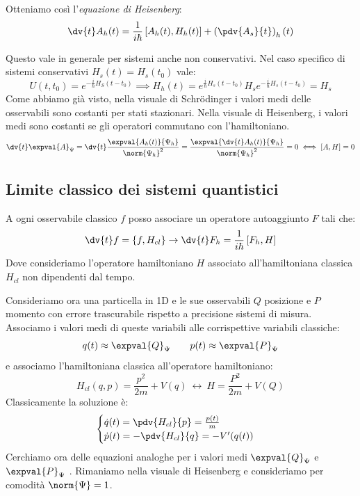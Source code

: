 Otteniamo così l'\textit{equazione di Heisenberg}:
\begin{equation}
    \dv{t} A_h(t) = \frac{1}{i\hbar}\left[ A_h(t), H_h(t) \right]   + \left( \pdv{A_s}{t} \right)_h (t)
\end{equation}

Questo vale in generale per sistemi anche non conservativi. Nel caso specifico di sistemi conservativi \(H_s(t)= H_s(t_0)\) vale:
\begin{equation}
    U(t,t_0)= e^{-\frac{i}{\hbar } H_S (t-t_0)} \implies H_h(t)= e^{\frac{i}{\hbar }H_s(t-t_0)}H_s e^{-\frac{i}{\hbar} H_s(t-t_0)} = H_s
\end{equation}
Come abbiamo già visto, nella visuale di Schrödinger i valori medi delle osservabili sono costanti per stati stazionari.
Nella visuale di Heisenberg, i valori medi sono costanti se gli operatori commutano con l'hamiltoniano.
\begin{equation}
    \dv{t}\expval{A}_\Psi = \dv{t} \frac{\expval{A_h(t)}{\Psi_h}}{\norm{\Psi_h}^2}= \frac{\expval{\dv{t} A_h(t)}{\Psi_h}}{\norm{\Psi_h}^2} = 0 
        \iff \left[ A,H \right] =0
\end{equation}


\subsection{Limite classico dei sistemi quantistici}
A ogni osservabile classico \(f \) posso associare un operatore autoaggiunto \(F\) tali che:
\[
    \dv{t} f = \left\{ f, H_{cl} \right\} \to \dv{t} F_h = \frac{1}{i\hbar} \left[ F_h, H\right]   
\]
Dove consideriamo l'operatore hamiltoniano \(H\) associato all'hamiltoniana classica \(H_{cl}\) non dipendenti dal tempo.

Consideriamo ora una particella in 1D e le sue osservabili \(Q\) posizione e \(P\) momento con errore trascurabile rispetto a precisione sistemi di misura.\\
Associamo i valori medi di queste variabili alle corrispettive variabili classiche:
\[
    q(t) \approx \expval{Q}_\Psi \qquad p(t) \approx \expval{P}_\Psi    
\]
e associamo l'hamiltoniana classica all'operatore hamiltoniano:
\[
    H_{cl} (q,p)= \frac{p^2}{2m} + V(q)\  \longleftrightarrow \ H = \frac{P^2}{2m} + V(Q)
\]
Classicamente la soluzione è:
\[
    \begin{cases}
        \dot{q}(t) = \pdv{H_{cl}}{p} = \frac{p(t)}{m}\\
        \dot{p}(t) = - \pdv{H_{cl}}{q} = - V' (q(t))
    \end{cases}
\]
Cerchiamo ora delle equazioni analoghe per i valori medi \(\expval{Q}_\Psi\) e \(\expval{P}_\Psi\) . 
Rimaniamo nella visuale di Heisenberg e consideriamo per comodità \(\norm{\Psi}=1\).

